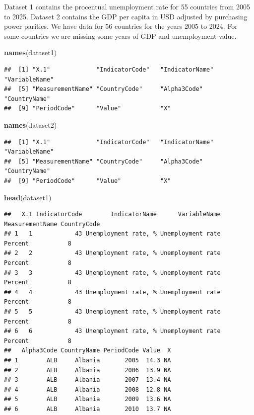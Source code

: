\documentclass[
]{article}
\newenvironment{Shaded}{\begin{snugshade}}{\end{snugshade}}
\newcommand{\FunctionTok}[1]{\textcolor[rgb]{0.13,0.29,0.53}{\textbf{#1}}}
\newcommand{\NormalTok}[1]{#1}
\begin{document}
Dataset 1 contains the procentual unemployment rate for 55 countries
from 2005 to 2025. Dataset 2 contains the GDP per capita in USD adjusted
by purchasing power parities. We have data for 56 countries for the
years 2005 to 2024. For some countries we are missing some years of GDP
and unemployment value.

\begin{Shaded}
\begin{Highlighting}[]
\FunctionTok{names}\NormalTok{(dataset1)}
\end{Highlighting}
\end{Shaded}

\begin{verbatim}
##  [1] "X.1"             "IndicatorCode"   "IndicatorName"   "VariableName"   
##  [5] "MeasurementName" "CountryCode"     "Alpha3Code"      "CountryName"    
##  [9] "PeriodCode"      "Value"           "X"
\end{verbatim}

\begin{Shaded}
\begin{Highlighting}[]
\FunctionTok{names}\NormalTok{(dataset2)}
\end{Highlighting}
\end{Shaded}

\begin{verbatim}
##  [1] "X.1"             "IndicatorCode"   "IndicatorName"   "VariableName"   
##  [5] "MeasurementName" "CountryCode"     "Alpha3Code"      "CountryName"    
##  [9] "PeriodCode"      "Value"           "X"
\end{verbatim}

\begin{Shaded}
\begin{Highlighting}[]
\FunctionTok{head}\NormalTok{(dataset1)}
\end{Highlighting}
\end{Shaded}

\begin{verbatim}
##   X.1 IndicatorCode        IndicatorName      VariableName MeasurementName CountryCode
## 1   1            43 Unemployment rate, % Unemployment rate         Percent           8
## 2   2            43 Unemployment rate, % Unemployment rate         Percent           8
## 3   3            43 Unemployment rate, % Unemployment rate         Percent           8
## 4   4            43 Unemployment rate, % Unemployment rate         Percent           8
## 5   5            43 Unemployment rate, % Unemployment rate         Percent           8
## 6   6            43 Unemployment rate, % Unemployment rate         Percent           8
##   Alpha3Code CountryName PeriodCode Value  X
## 1        ALB     Albania       2005  14.3 NA
## 2        ALB     Albania       2006  13.9 NA
## 3        ALB     Albania       2007  13.4 NA
## 4        ALB     Albania       2008  12.8 NA
## 5        ALB     Albania       2009  13.6 NA
## 6        ALB     Albania       2010  13.7 NA
\end{verbatim}
\end{document}
